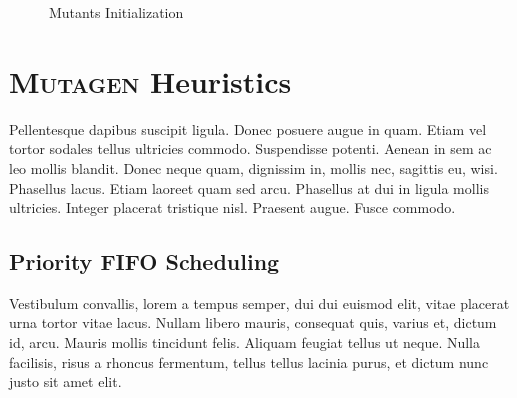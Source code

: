 \documentclass[acmsmall, anonymous]{acmart}
\newcommand{\mutagen}{\textsc{Mutagen}\xspace}
\begin{document}
\begin{figure}

\begin{algorithm}[H]
  \SetInd{0em}{0.75em}
  \SetAlgoLined
  \DontPrintSemicolon
\caption{Mutants Initialization}
\end{algorithm}

\end{figure}


\section{\mutagen Heuristics}
\label{sec:heuristics}

Pellentesque dapibus suscipit ligula. Donec posuere augue in quam. Etiam vel
tortor sodales tellus ultricies commodo. Suspendisse potenti. Aenean in sem ac
leo mollis blandit. Donec neque quam, dignissim in, mollis nec, sagittis eu,
wisi. Phasellus lacus. Etiam laoreet quam sed arcu. Phasellus at dui in ligula
mollis ultricies. Integer placerat tristique nisl. Praesent augue. Fusce
commodo.

\subsection{Priority FIFO Scheduling}

Vestibulum convallis, lorem a tempus semper, dui dui euismod elit,
vitae placerat urna tortor vitae lacus. Nullam libero mauris, consequat quis,
varius et, dictum id, arcu. Mauris mollis tincidunt felis. Aliquam feugiat
tellus ut neque. Nulla facilisis, risus a rhoncus fermentum, tellus tellus
lacinia purus, et dictum nunc justo sit amet elit.
\end{document}
